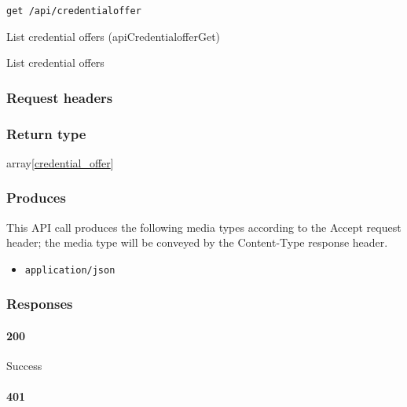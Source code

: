 \protect\hypertarget{apiCredentialofferGet}{}{}

\begin{verbatim}
get /api/credentialoffer
\end{verbatim}

List credential offers ({apiCredentialofferGet})

List credential offers

\hypertarget{request-headers-35}{%
\subsubsection{Request headers}\label{request-headers-35}}

\hypertarget{return-type-52}{%
\subsubsection{Return type}\label{return-type-52}}

array{[}\protect\hyperlink{credential_offer}{credential\_offer}{]}

\hypertarget{produces-64}{%
\subsubsection{Produces}\label{produces-64}}

This API call produces the following media types according to the
{Accept} request header; the media type will be conveyed by the
{Content-Type} response header.

\begin{itemize}
\tightlist
\item
  \texttt{application/json}
\end{itemize}

\hypertarget{responses-64}{%
\subsubsection{Responses}\label{responses-64}}

\hypertarget{section-213}{%
\paragraph{200}\label{section-213}}

Success

\hypertarget{section-214}{%
\paragraph{401}\label{section-214}}

